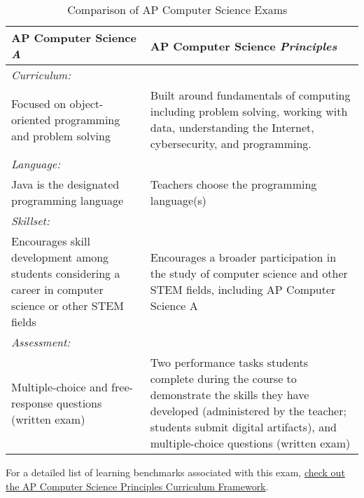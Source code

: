\begin{table}
	\centering
	\bgroup
	\def\arraystretch{1.5}
	\begin{tabular}{ p{7cm} p{7cm} }
		\hline
		\textbf{AP Computer Science \textit{A}} &	\textbf{AP Computer Science \textit{Principles}} \\ \hline \hline
		\multicolumn{2}{l}{\textit{Curriculum:}} \\
		Focused on object-oriented programming and problem solving & Built around fundamentals of computing including problem solving, working with data, understanding the Internet, cybersecurity, and programming. \\ \hline
		\multicolumn{2}{l}{\textit{Language:}} \\
		Java is the designated programming language	& Teachers choose the programming language(s) \\ \hline
		\multicolumn{2}{l}{\textit{Skillset:}} \\
		Encourages skill development among students considering a career in computer science or other STEM fields & Encourages a broader participation in the study of computer science and other STEM fields, including AP Computer Science A \\ \hline
		\multicolumn{2}{l}{\textit{Assessment:}} \\
		Multiple-choice and free-response questions (written exam) & Two performance tasks students complete during the course to demonstrate the skills they have developed (administered by the teacher; students submit digital artifacts), and multiple-choice questions (written exam) \\ \hline
	\end{tabular}
	\egroup 
	\caption{Comparison of AP Computer Science Exams ~\cite{APcomp}} \label{tab:apexams} 
\end{table}\par
For a detailed list of learning benchmarks associated with this exam, \href{https://secure-media.collegeboard.org/digitalServices/pdf/ap/ap-computer-science-principles-curriculum-framework.pdf}{check out the AP Computer Science Principles Curriculum Framework}.
